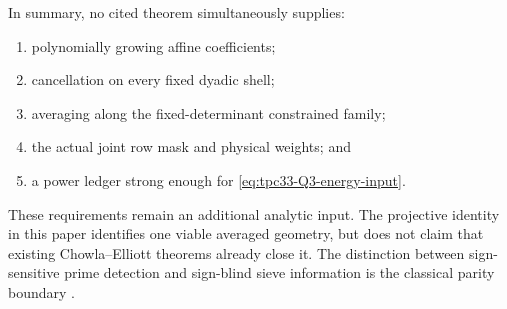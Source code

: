 In summary, no cited theorem simultaneously supplies:
\begin{enumerate}[label=\textup{(\roman*)}]
 \item polynomially growing affine coefficients;
 \item cancellation on every fixed dyadic shell;
 \item averaging along the fixed-determinant constrained family;
 \item the actual joint row mask and physical weights; and
 \item a power ledger strong enough for \eqref{eq:tpc33-Q3-energy-input}.
\end{enumerate}
These requirements remain an additional analytic input.  The projective
identity in this paper identifies one viable averaged geometry, but does
not claim that existing Chowla--Elliott theorems already close it.
The distinction between sign-sensitive prime detection and sign-blind
sieve information is the classical parity boundary
\citep{HeathBrown1982Parity}.
